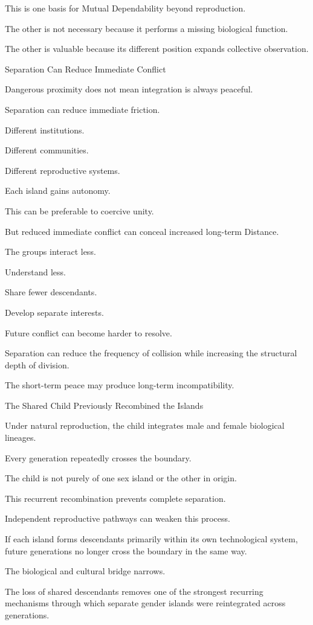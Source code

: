 This is one basis for Mutual Dependability beyond reproduction.

The other is not necessary because it performs a missing biological function.

The other is valuable because its different position expands collective observation.

Separation Can Reduce Immediate Conflict

Dangerous proximity does not mean integration is always peaceful.

Separation can reduce immediate friction.

Different institutions.

Different communities.

Different reproductive systems.

Each island gains autonomy.

This can be preferable to coercive unity.

But reduced immediate conflict can conceal increased long-term Distance.

The groups interact less.

Understand less.

Share fewer descendants.

Develop separate interests.

Future conflict can become harder to resolve.

Separation can reduce the frequency of collision while increasing the structural depth of division.

The short-term peace may produce long-term incompatibility.

The Shared Child Previously Recombined the Islands

Under natural reproduction, the child integrates male and female biological lineages.

Every generation repeatedly crosses the boundary.

The child is not purely of one sex island or the other in origin.

This recurrent recombination prevents complete separation.

Independent reproductive pathways can weaken this process.

If each island forms descendants primarily within its own technological system, future generations no longer cross the boundary in the same way.

The biological and cultural bridge narrows.

The loss of shared descendants removes one of the strongest recurring mechanisms through which separate gender islands were reintegrated across generations.

